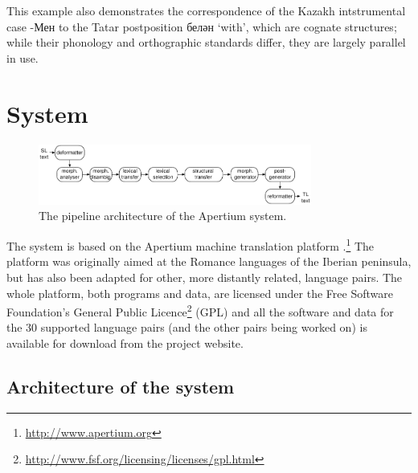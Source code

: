 \documentclass[a4paper,11pt]{article}
\newcommand{\eng}[1]{`#1'}
\begin{document}
This example also demonstrates the correspondence of the Kazakh intstrumental case -Мен to the Tatar postposition белән \eng{with}, which are cognate structures; while their phonology and orthographic standards differ, they are largely parallel in use.

\section{System}
\label{sec:sys}

\begin{figure}[htbp]
\begin{center}
 \includegraphics[width=0.8\textwidth]{architecture.pdf}
\end{center}
\caption{The pipeline architecture of the Apertium system.}
\label{fig:modules}
\end{figure}

The system is based on the Apertium machine translation 
platform \citep{apertium/2011}.\footnote{\url{http://www.apertium.org}} The 
platform was originally aimed at the Romance languages of the Iberian peninsula, but has also been adapted for 
other, more distantly related, language pairs.
The whole platform, both programs and data, are licensed under the Free Software Foundation's General Public 
Licence\footnote{\url{http://www.fsf.org/licensing/licenses/gpl.html}} (GPL) and all the software and data for the 
30 supported language pairs (and the other pairs being worked on) is available for download from the project 
website.

\subsection{Architecture of the system}
\end{document}
